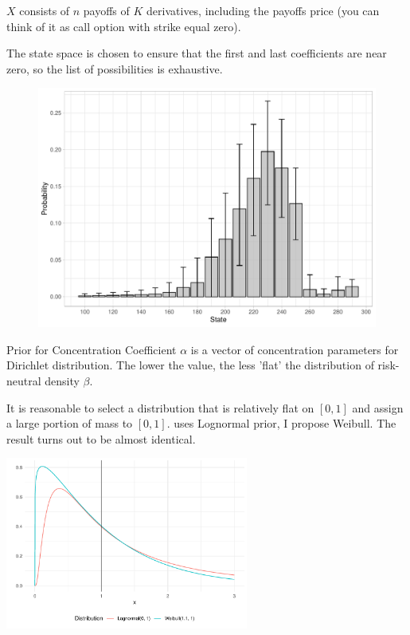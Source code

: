\documentclass[10pt,aspectratio=43]{beamer}
\begin{document}
\begin{frame}{}
$X$ consists of $n$ payoffs of $K$ derivatives, including the payoffs price (you can think of it as call option with strike equal zero).

The state space is chosen to ensure that the first and last coefficients are near zero, so the list of possibilities is exhaustive.
 \begin{figure}\centering
    \begin{minipage}{0.6\linewidth}
        \centering
                \includegraphics[width=\linewidth]{betas_01_3.pdf}
    \end{minipage}
    \end{figure}

\end{frame}

\begin{frame}{Prior for Concentration Coefficient}
    $\alpha$ is a vector of concentration parameters for Dirichlet distribution. The lower the value, the less 'flat' the distribution of risk-neutral density $\beta$.
    
    It is reasonable to select a distribution that is relatively flat on $[0,1]$ and assign a large portion of mass to $[0,1]$. \cite{fisherSimplexRegression2016} uses Lognormal prior, I propose Weibull. The result turns out to be almost identical.

    \includegraphics[width=0.6\textwidth]{prior_difference.pdf}

\end{frame}
\end{document}
